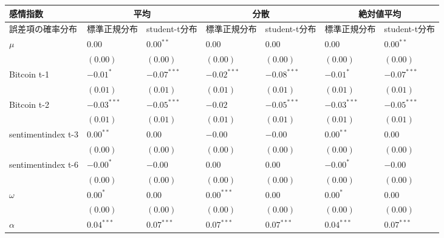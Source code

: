 \begin{landscape}
\begin{table}[]
\begin{tabular}{lllllll}
\hline
感情指数               & \multicolumn{2}{c}{平均}        & \multicolumn{2}{c}{分散}        & \multicolumn{2}{c}{絶対値平均}     \\ \hline
誤差項の確率分布           & 標準正規分布        & student-t分布   & 標準正規分布        & student-t分布   & 標準正規分布        & student-t分布   \\ \hline
$\mu$              & $0.00$        & $0.00^{**}$   & $0.00$        & $0.00$        & $0.00$        & $0.00^{**}$   \\
                   & $(0.00)$      & $(0.00)$      & $(0.00)$      & $(0.00)$      & $(0.00)$      & $(0.00)$      \\
Bitcoin t-1        & $-0.01^{*}$   & $-0.07^{***}$ & $-0.02^{***}$ & $-0.08^{***}$ & $-0.01^{*}$   & $-0.07^{***}$ \\
                   & $(0.01)$      & $(0.01)$      & $(0.01)$      & $(0.01)$      & $(0.01)$      & $(0.01)$      \\
Bitcoin t-2        & $-0.03^{***}$ & $-0.05^{***}$ & $-0.02$       & $-0.05^{***}$ & $-0.03^{***}$ & $-0.05^{***}$ \\
                   & $(0.01)$      & $(0.01)$      & $(0.01)$      & $(0.01)$      & $(0.01)$      & $(0.01)$      \\
sentimentindex t-3 & $0.00^{**}$   & $0.00$        & $-0.00$       & $-0.00$       & $0.00^{**}$   & $0.00$        \\
                   & $(0.00)$      & $(0.00)$      & $(0.00)$      & $(0.00)$      & $(0.00)$      & $(0.00)$      \\
sentimentindex t-6 & $-0.00^{*}$   & $-0.00$       & $0.00$        & $0.00$        & $-0.00^{*}$   & $-0.00$       \\
                   & $(0.00)$      & $(0.00)$      & $(0.00)$      & $(0.00)$      & $(0.00)$      & $(0.00)$      \\
$\omega$           & $0.00^{*}$    & $0.00$        & $0.00^{***}$  & $0.00$        & $0.00^{*}$    & $0.00$        \\
                   & $(0.00)$      & $(0.00)$      & $(0.00)$      & $(0.00)$      & $(0.00)$      & $(0.00)$      \\
$\alpha$           & $0.04^{***}$  & $0.07^{***}$  & $0.07^{***}$  & $0.07^{***}$  & $0.04^{***}$  & $0.07^{***}$  \\

\end{tabular}
\end{table}
\end{landscape}
